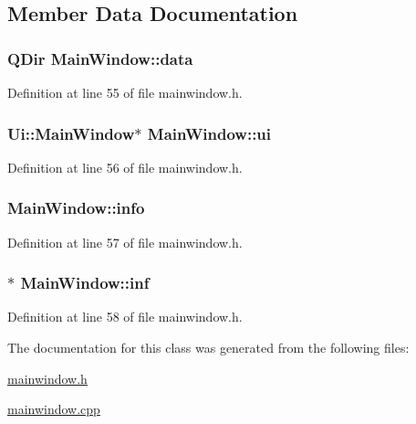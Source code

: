 \subsection{Member Data Documentation}
\hypertarget{class_main_window_a1dc35bda22acc11636be809539ab73d9}{
\subsubsection[{data}]{\setlength{\rightskip}{0pt plus 5cm}Q\+Dir Main\+Window\+::data\hspace{0.3cm}{\ttfamily [private]}}}\label{class_main_window_a1dc35bda22acc11636be809539ab73d9}


Definition at line 55 of file mainwindow.\+h.

\hypertarget{class_main_window_a35466a70ed47252a0191168126a352a5}{
\subsubsection[{ui}]{\setlength{\rightskip}{0pt plus 5cm}Ui\+::\+Main\+Window$\ast$ Main\+Window\+::ui\hspace{0.3cm}{\ttfamily [private]}}}\label{class_main_window_a35466a70ed47252a0191168126a352a5}


Definition at line 56 of file mainwindow.\+h.

\hypertarget{class_main_window_a2d1f101eed410e692b5db9b7226174bf}{
\subsubsection[{info}]{ Main\+Window\+::info\hspace{0.3cm}{\ttfamily [private]}}}\label{class_main_window_a2d1f101eed410e692b5db9b7226174bf}


Definition at line 57 of file mainwindow.\+h.

\hypertarget{class_main_window_a2066670e4565617fa50daa7701226aa8}{
\subsubsection[{inf}]{$\ast$ Main\+Window\+::inf\hspace{0.3cm}{\ttfamily [private]}}}\label{class_main_window_a2066670e4565617fa50daa7701226aa8}


Definition at line 58 of file mainwindow.\+h.



The documentation for this class was generated from the following files\+:\begin{DoxyCompactItemize}
\item 
\hyperlink{mainwindow_8h}{mainwindow.\+h}\item 
\hyperlink{mainwindow_8cpp}{mainwindow.\+cpp}\end{DoxyCompactItemize}
